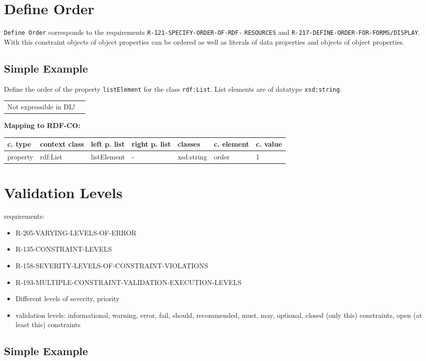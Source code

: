 \documentclass{llncs}
\newcommand{\ms}[1]{\texttt{#1}}
\newenvironment{gcotable}{
  \scriptsize
  \sffamily
  \vspace{0cm}
	\begin{center}
	\textbf{\vspace{0.4cm}Mapping to RDF-CO:} \\
  \begin{tabular}{l|l|l|l|l|l|l}
	\hline
  \textbf{c. type} & \textbf{context class} & \textbf{left p. list} & \textbf{right p. list} & \textbf{classes} & \textbf{c. element} & \textbf{c. value} \\
  \hline

}{
  \hline
  \end{tabular}
	\end{center}
}
\newenvironment{DL}{
  \vspace{0cm}
	\begin{center}
  \begin{tabular}{r l}

}{
  \end{tabular}
	\end{center}
}
\begin{document}
\section{Define Order}

\ms{Define Order} corresponds to the requirements
\ms{R-121-SPECIFY-ORDER-OF-RDF-} \ms{RESOURCES} and
\ms{R-217-DEFINE-ORDER-FOR-FORMS/DISPLAY}.
With this constraint objects of object properties can be ordered as well as literals of data properties and objects of object properties.

\subsection{Simple Example}

Define the order of the property \ms{listElement} for the class \ms{rdf:List}.
List elements are of datatype \ms{xsd:string}.

\begin{DL}
Not expressible in DL!
\end{DL}

\begin{gcotable}
property & rdf:List & listElement & - & xsd:string & order & 1 \\
\end{gcotable}

\section{Validation Levels}

requirements:

\begin{itemize}
	\item R-205-VARYING-LEVELS-OF-ERROR
	\item R-135-CONSTRAINT-LEVELS
	\item R-158-SEVERITY-LEVELS-OF-CONSTRAINT-VIOLATIONS
	\item R-193-MULTIPLE-CONSTRAINT-VALIDATION-EXECUTION-LEVELS
\end{itemize}

\begin{itemize}
  \item Different levels of severity, priority
	\item validation levels: informational, warning, error, fail, should, recommended, must, may, optional, closed (only this) constraints, open (at least this) constraints
\end{itemize}

\subsection{Simple Example}
\end{document}
